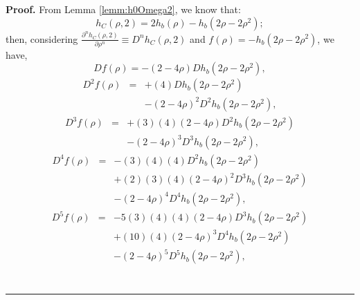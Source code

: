 \documentclass[a4paper,10pt]{article}
\newenvironment{myproof}[1][Proof]{\textbf{#1.} }{\ \rule{0.5em}{0.5em}}
\begin{document}
\begin{myproof}\label{proof:Dnh0Omega2}
From Lemma \ref{lemm:h0Omega2}, we know that:
\begin{equation}\label{eq:ProofDnh0Omega2_0}
h_{C}(\rho,2) = 2 h_{b}(\rho) - h_{b}(2\rho-2\rho^2);
\end{equation}
then, considering $\frac{\partial^n  h_{C}(\rho,2)}{\partial \rho^n } \equiv D^n h_{C}(\rho,2)$
and $f(\rho)=-h_{b}(2\rho-2\rho^2)$, we have,
\begin{equation}\label{eq:ProofDnh0Omega2_1}
D   f(\rho) =  - (2-4\rho) D h_{b}(2\rho-2\rho^2),
\end{equation}
\begin{equation}\label{eq:ProofDnh0Omega2_2}
\begin{matrix}
D^2 f(\rho) &=& + (4) D h_{b}(2\rho-2\rho^2) \\
           ~&~&- (2-4\rho)^2 D^2 h_{b}(2\rho-2\rho^2) ,
\end{matrix}
\end{equation}
\begin{equation}\label{eq:ProofDnh0Omega2_3}
\begin{matrix}
D^3 f(\rho) &=& +(3) (4)(2-4\rho) D^2 h_{b}(2\rho-2\rho^2)\\
           ~&~& - (2-4\rho)^3 D^3 h_{b}(2\rho-2\rho^2),
\end{matrix}
\end{equation}
\begin{equation}\label{eq:ProofDnh0Omega2_4}
\begin{matrix}
D^4 f(\rho) &=& -(3)(4)(4) D^2 h_{b}(2\rho-2\rho^2) \\
           ~&~& +(2)(3)(4)(2-4\rho)^2 D^3 h_{b}(2\rho-2\rho^2)  \\
           ~&~&-(2-4\rho)^4 D^4 h_{b}(2\rho-2\rho^2),
\end{matrix}
\end{equation}
\begin{equation}\label{eq:ProofDnh0Omega2_5}
\begin{matrix}
D^5 f(\rho) &=& -5(3)(4)(4)(2-4\rho) D^3 h_{b}(2\rho-2\rho^2) \\
           ~&~& +(10)(4)(2-4\rho)^3 D^4 h_{b}(2\rho-2\rho^2) \\
           ~&~&-(2-4\rho)^5 D^5 h_{b}(2\rho-2\rho^2),
\end{matrix}
\end{equation}
\begin{equation}\label{eq:ProofDnh0Omega2_6}
\begin{matrix}

\end{matrix}
\end{equation}
\end{myproof}
\end{document}
